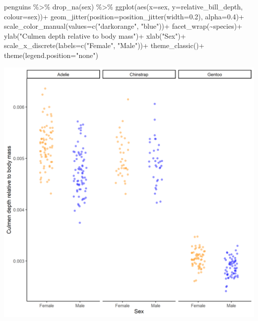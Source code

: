 \documentclass[
]{book}
\newenvironment{Shaded}{\begin{snugshade}}{\end{snugshade}}
\newcommand{\AttributeTok}[1]{\textcolor[rgb]{0.77,0.63,0.00}{#1}}
\newcommand{\FloatTok}[1]{\textcolor[rgb]{0.00,0.00,0.81}{#1}}
\newcommand{\FunctionTok}[1]{\textcolor[rgb]{0.00,0.00,0.00}{#1}}
\newcommand{\NormalTok}[1]{#1}
\newcommand{\SpecialCharTok}[1]{\textcolor[rgb]{0.00,0.00,0.00}{#1}}
\newcommand{\StringTok}[1]{\textcolor[rgb]{0.31,0.60,0.02}{#1}}
\begin{document}
\begin{Shaded}
\begin{Highlighting}[]
\NormalTok{penguins }\SpecialCharTok{\%\textgreater{}\%} 
    \FunctionTok{drop\_na}\NormalTok{(sex) }\SpecialCharTok{\%\textgreater{}\%} 
    \FunctionTok{ggplot}\NormalTok{(}\FunctionTok{aes}\NormalTok{(}\AttributeTok{x=}\NormalTok{sex, }
               \AttributeTok{y=}\NormalTok{relative\_bill\_depth,}
               \AttributeTok{colour=}\NormalTok{sex))}\SpecialCharTok{+}
    \FunctionTok{geom\_jitter}\NormalTok{(}\AttributeTok{position=}\FunctionTok{position\_jitter}\NormalTok{(}\AttributeTok{width=}\FloatTok{0.2}\NormalTok{), }
                \AttributeTok{alpha=}\FloatTok{0.4}\NormalTok{)}\SpecialCharTok{+}
  \FunctionTok{scale\_color\_manual}\NormalTok{(}\AttributeTok{values=}\FunctionTok{c}\NormalTok{(}\StringTok{"darkorange"}\NormalTok{, }\StringTok{"blue"}\NormalTok{))}\SpecialCharTok{+}
        \FunctionTok{facet\_wrap}\NormalTok{(}\SpecialCharTok{\textasciitilde{}}\NormalTok{species)}\SpecialCharTok{+}
  \FunctionTok{ylab}\NormalTok{(}\StringTok{"Culmen depth relative to body mass"}\NormalTok{)}\SpecialCharTok{+}
  \FunctionTok{xlab}\NormalTok{(}\StringTok{"Sex"}\NormalTok{)}\SpecialCharTok{+}
  \FunctionTok{scale\_x\_discrete}\NormalTok{(}\AttributeTok{labels=}\FunctionTok{c}\NormalTok{(}\StringTok{"Female"}\NormalTok{, }\StringTok{"Male"}\NormalTok{))}\SpecialCharTok{+}
  \FunctionTok{theme\_classic}\NormalTok{()}\SpecialCharTok{+}
  \FunctionTok{theme}\NormalTok{(}\AttributeTok{legend.position=}\StringTok{"none"}\NormalTok{)}
\end{Highlighting}
\end{Shaded}

\includegraphics[width=0.8\linewidth]{images/final_figure_penguins}
\end{document}
